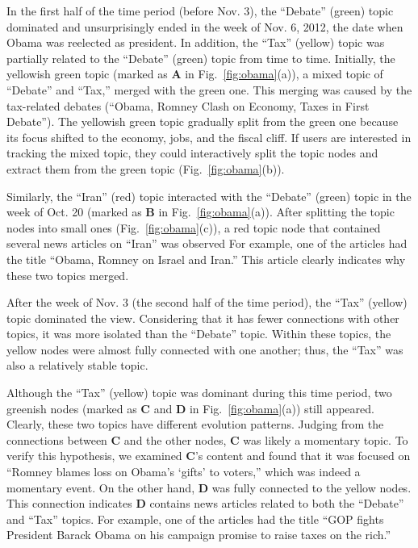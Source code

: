 In the first half of the time period (before Nov. 3), the ``Debate'' (green) topic dominated and unsurprisingly ended in the week of Nov. 6, 2012, the date when Obama was reelected as president.
In addition, the ``Tax'' (yellow) topic was partially related to the ``Debate'' (green) topic from time to time.
Initially, the yellowish green topic (marked as \textbf{A} in Fig.~\ref{fig:obama}(a)), a mixed topic of ``Debate'' and ``Tax,'' merged with the green one.
This merging was caused by the tax-related debates (``Obama, Romney Clash on Economy, Taxes in First Debate'').
The yellowish green topic gradually split from the green one because its focus shifted to the economy, jobs, and the fiscal cliff.
If users are interested in tracking the mixed topic, they could interactively split the topic nodes and extract them from the green topic (Fig.~\ref{fig:obama}(b)).


Similarly, the ``Iran'' (red) topic  interacted with the ``Debate'' (green) topic in the week of Oct. 20 (marked as \textbf{B} in Fig.~\ref{fig:obama}(a)).
After splitting the topic nodes into small ones (Fig.~\ref{fig:obama}(c)), a red topic node that contained several news articles on ``Iran'' was observed
For example, one of the articles had the title ``Obama, Romney on Israel and Iran.'' This article clearly indicates why these two topics merged.

After the week of Nov. 3 (the second half of the time period), the ``Tax'' (yellow) topic dominated the view.
Considering that it has fewer connections with other topics, it was more isolated than the ``Debate'' topic.
Within these topics, the yellow nodes were almost fully connected with one another; thus, the ``Tax'' was also a relatively stable topic.

Although the ``Tax'' (yellow) topic was dominant during this time period, two greenish nodes (marked as \textbf{C} and \textbf{D} in Fig.~\ref{fig:obama}(a)) still appeared.
Clearly, these two topics have different evolution patterns.
Judging from the connections between \textbf{C} and the other nodes, \textbf{C} was likely a momentary topic.
To verify this hypothesis, we examined \textbf{C}'s content and found that it was focused on ``Romney blames loss on Obama's `gifts' to voters,'' which was indeed a momentary event.
On the other hand, \textbf{D} was fully connected to the yellow nodes. This connection indicates \textbf{D} contains news articles related to both the ``Debate'' and ``Tax'' topics. For example, one of the articles had the title ``GOP fights President Barack Obama on his campaign promise to raise taxes on the rich.''


